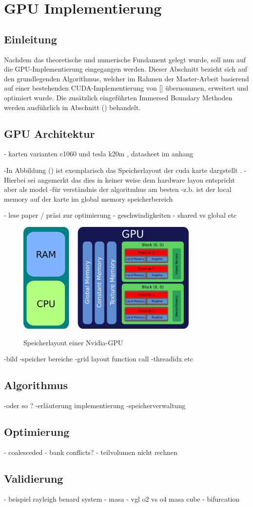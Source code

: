 \chapter{GPU Implementierung}

\section{Einleitung}

Nachdem das theoretische und numerische Fundament gelegt wurde, soll nun auf die GPU-Implementierung eingegangen werden.
Dieser Abschnitt bezieht sich auf den grundlegenden Algorithmus, welcher im Rahmen der Master-Arbeit basierend auf einer bestehenden
CUDA-Implementierung von [] übernommen, erweitert und optimiert wurde.
Die zusätzlich eingeführten  Immersed Boundary Methoden werden ausführlich in Abschnitt () behandelt.

\section{GPU Architektur}
- karten varianten c1060 und tesla k20m , datasheet im anhang

-In Abbildung () ist exemplarisch das Speicherlayout der cuda karte dargstellt .
-Hierbei sei angemerkt das dies in keiner weise dem hardware layou entspricht aber als model
-für verständnis der algoritmhus am besten
-z.b. ist der local memory auf der karte im global memory speicherbereich

- lese paper / präsi zur optimierung
- geschwindigkeiten
- shared vs global etc

\begin{figure}[!bp]
  \centering
  \includegraphics[width=0.8\textwidth]{gfx/cuda/gpu.png}\label{fig:gpu_arch}
  \caption{Speicherlayout einer Nvidia-GPU}
\end{figure}

-bild
-speicher bereiche
-grid layout function call
-threadidx etc

\section{Algorithmus}
-oder so ?
-erläuterung  implementierung
-speicherverwaltung

\section{Optimierung}
- coalesceded
- bank conflicts?
- teilvolumen nicht rechnen

\section{Validierung}
- beispiel rayleigh benard system
- masa
- vgl o2 vs o4 masa cube
- bifurcation


\newpage

